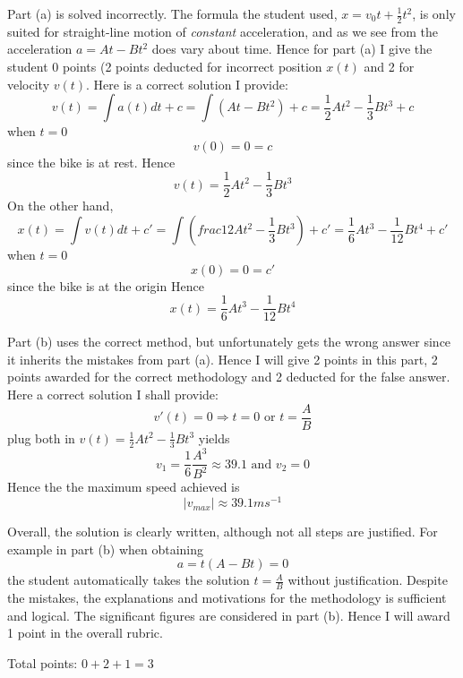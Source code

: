 \documentclass[]{book}
\begin{document}
Part (a) is solved incorrectly.\medbreak
The formula the student used, $x=v_0t+\frac{1}{2}t^2$, is only suited for straight-line motion of \emph{constant} acceleration, and as we see from the acceleration $a=At-Bt^2$ does vary about time.\medbreak
Hence for part (a) I give the student 0 points (2 points deducted for incorrect position $x(t)$ and 2 for velocity $v(t)$.\medbreak
Here is a correct solution I provide:
\[v(t)=\int a(t)dt+c=\int(At-Bt^2)+c=\frac{1}{2}At^2-\frac{1}{3}Bt^3+c\]
when $t=0$
\[v(0)=0=c\]
since the bike is at rest.
Hence
\[v(t)=\frac{1}{2}At^2-\frac{1}{3}Bt^3\]
On the other hand,
\[x(t)=\int v(t)dt+c'=\int(frac{1}{2}At^2-\frac{1}{3}Bt^3)+c'=\frac{1}{6}At^3-\frac{1}{12}Bt^4+c'\]
when $t=0$
\[x(0)=0=c'\]
since the bike is at the origin
Hence
\[x(t)=\frac{1}{6}At^3-\frac{1}{12}Bt^4\]

\bigbreak
Part (b) uses the correct method, but unfortunately gets the wrong answer since it inherits the mistakes from part (a).\medbreak
Hence I will give 2 points in this part, 2 points awarded for the correct methodology and 2 deducted for the false answer.\medbreak
Here a correct solution I shall provide:
\[v'(t)=0\Rightarrow t=0\textrm{ or }t=\frac{A}{B}\]
plug both in $v(t)=\frac{1}{2}At^2-\frac{1}{3}Bt^3$ yields
\[v_1=\frac{1}{6}\frac{A^3}{B^2}\approx39.1\textrm{ and }v_2=0\]
Hence the the maximum speed achieved is
\[|v_{max}|\approx39.1ms^{-1}\]
\bigbreak

Overall, the solution is clearly written, although not all steps are justified. For example in part (b) when obtaining
\[a=t(A-Bt)=0\]
the student automatically takes the solution $t=\frac{A}{B}$ without justification. Despite the mistakes, the explanations and motivations for the methodology is sufficient and logical. The significant figures are considered in part (b). Hence I will award 1 point in the overall rubric.\medbreak

Total points: $0+2+1=3$
\end{document}
